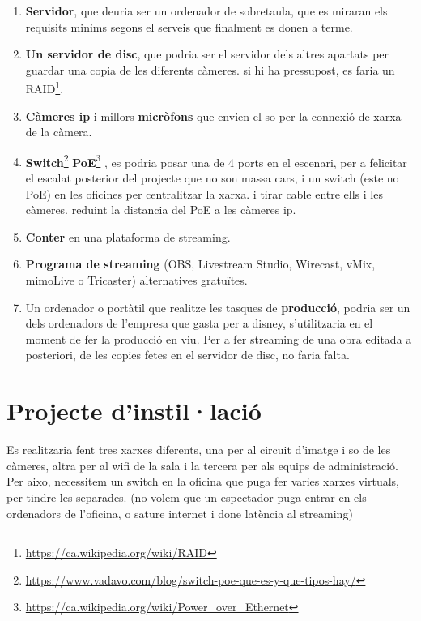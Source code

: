 \documentclass[
  10pt,
]{krantz}
\DeclareRobustCommand{\href}[2]{#2\footnote{\url{#1}}}
\begin{document}
\begin{enumerate}
\def\labelenumi{\arabic{enumi}.}
\item
  \textbf{Servidor}, que deuria ser un ordenador de sobretaula, que es miraran els requisits minims segons el serveis que finalment es donen a terme.
\item
  \textbf{Un servidor de disc}, que podria ser el servidor dels altres apartats per guardar una copia de les diferents càmeres. si hi ha pressupost, es faria un \href{https://ca.wikipedia.org/wiki/RAID}{RAID}.
\item
  \textbf{Càmeres ip} i millors \textbf{micròfons} que envien el so per la connexió de xarxa de la càmera.
\item
  \href{https://www.vadavo.com/blog/switch-poe-que-es-y-que-tipos-hay/}{\textbf{Switch}} \href{https://ca.wikipedia.org/wiki/Power_over_Ethernet}{\textbf{PoE}} , es podria posar una de 4 ports en el escenari, per a felicitar el escalat posterior del projecte que no son massa cars, i un switch (este no PoE) en les oficines per centralitzar la xarxa. i tirar cable entre ells i les càmeres. reduint la distancia del PoE a les càmeres ip.
\item
  \textbf{Conter} en una plataforma de streaming.
\item
  \textbf{Programa de streaming} (OBS, Livestream Studio, Wirecast, vMix, mimoLive o Tricaster) alternatives gratuïtes.
\item
  Un ordenador o portàtil que realitze les tasques de \textbf{producció}, podria ser un dels ordenadors de l'empresa que gasta per a disney, s'utilitzaria en el moment de fer la producció en viu. Per a fer streaming de una obra editada a posteriori, de les copies fetes en el servidor de disc, no faria falta.
\end{enumerate}

\hypertarget{projecte-dinstillaciuxf3}{%
\section{Projecte d'instil·lació}\label{projecte-dinstillaciuxf3}}

Es realitzaria fent tres xarxes diferents, una per al circuit d'imatge i so de les càmeres, altra per al wifi de la sala i la tercera per als equips de administració. Per aixo, necessitem un switch en la oficina que puga fer varies xarxes virtuals, per tindre-les separades. (no volem que un espectador puga entrar en els ordenadors de l'oficina, o sature internet i done latència al streaming)
\end{document}
